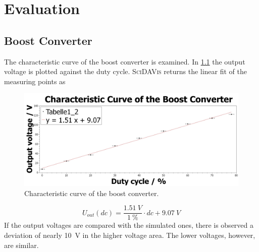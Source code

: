 \chapter{Evaluation}
%
\section{Boost Converter}
    The characteristic curve of the boost converter is examined. In \cref{fig:characteristic-curve-of-the-boost-converter}
    the output voltage is plotted against the duty cycle. \textsc{SciDAVis} returns the linear fit of the measuring points as
    \begin{figure}[h]
        \centering
        \includegraphics[width=\linewidth]{messdaten/Characteristic_Curve_of_the_Boost_Converter.jpg}
        \caption[Characteristic curve of the boost converter]{Characteristic curve of the boost converter.}
    \label{fig:characteristic-curve-of-the-boost-converter}
    \end{figure}
    \begin{equation}
        U_{out}(dc)=\frac{\SI{1.51}{V}}{\SI{1}{\percent}} \cdot dc + \SI{9.07}{V}
    \end{equation}
    If the output voltages are compared with the simulated ones, there is observed a deviation of nearly \SI{10}{V} in the
    higher voltage area. The lower voltages, however, are similar.
